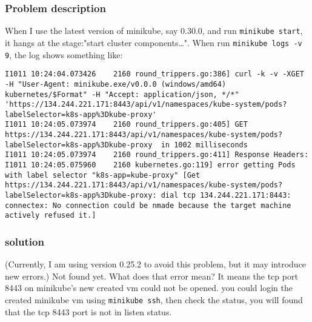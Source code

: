 \documentclass[11pt]{article}
\begin{document}
\subsubsection{Problem description}
\label{sec:org6039c22}
When I use the latest version of minikube, say 0.30.0, and run \texttt{minikube start}, it hangs at the stage:"start cluster components\ldots{}".
When run \texttt{minikube logs -v 9}, the log shows something like:
\begin{verbatim}
I1011 10:24:04.073426    2160 round_trippers.go:386] curl -k -v -XGET  -H "User-Agent: minikube.exe/v0.0.0 (windows/amd64) kubernetes/$Format" -H "Accept: application/json, */*" 'https://134.244.221.171:8443/api/v1/namespaces/kube-system/pods?labelSelector=k8s-app%3Dkube-proxy'
I1011 10:24:05.073974    2160 round_trippers.go:405] GET https://134.244.221.171:8443/api/v1/namespaces/kube-system/pods?labelSelector=k8s-app%3Dkube-proxy  in 1002 milliseconds
I1011 10:24:05.073974    2160 round_trippers.go:411] Response Headers:
I1011 10:24:05.075960    2160 kubernetes.go:119] error getting Pods with label selector "k8s-app=kube-proxy" [Get https://134.244.221.171:8443/api/v1/namespaces/kube-system/pods?labelSelector=k8s-app%3Dkube-proxy: dial tcp 134.244.221.171:8443: connectex: No connection could be nmade because the target machine actively refused it.]
\end{verbatim}
\subsubsection{solution}
\label{sec:orgee7b92c}
(Currently, I am using version 0.25.2 to avoid this problem, but it may introduce new errors.)
Not found yet.
What does that error mean?
It means the tcp port 8443 on minikube's new created vm could not be opened.
you could login the created minikube vm using \texttt{minikube ssh}, then check the status, you will found that the tcp 8443 port is not in listen status.
\end{document}
